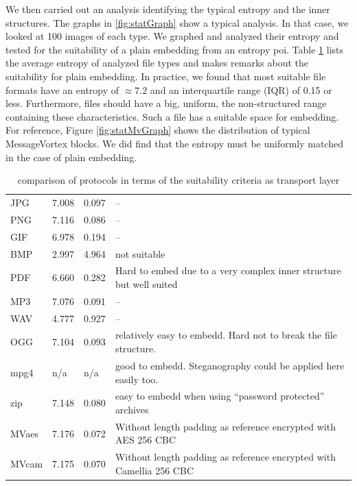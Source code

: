 We then carried out an analysis identifying the typical entropy and the inner structures. The graphs in \ref{fig:statGraph} show a typical analysis. In that case, we looked at 100 images of each type. We graphed and analyzed their entropy and tested for the suitability of a plain embedding from an entropy poi. Table \ref{tab:fileEntropy} lists the average entropy of analyzed file types and makes remarks about the suitability for plain embedding. In practice, we found that most suitable file formats have an entropy of $\approx 7.2$ and an interquartile range (IQR) of 0.15 or less. Furthermore, files should have a big, uniform, the non-structured range containing these characteristics. Such a file has a suitable space for embedding. For reference, Figure \ref{fig:statMvGraph} shows the distribution of typical MessageVortex blocks. We did find that the entropy must be uniformly matched in the case of plain embedding.

\begin{table}[!ht]
	\centering\tiny
	\begin{tabular}{|l|l|l|l|}\hline
		\diaghead{\theadfont Type Criteria}{Type}{Criteria} & \thead{Avg. Entropy}     & \thead{IQR} & \thead{Remarks}\\\hline
		JPG       & 7.008  & 0.097 & -- \\              
		PNG       & 7.116  & 0.086 & -- \\              
		GIF       & 6.978  & 0.194 & -- \\              
		BMP       & 2.997  & 4.964 & not suitable \\              
		PDF       & 6.660  & 0.282 & Hard to embed due to a very complex inner structure but well suited \\\hline              
		MP3       & 7.076  & 0.091 & -- \\              
		WAV       & 4.777  & 0.927 & -- \\              
		OGG       & 7.104  & 0.093 & relatively easy to embedd. Hard not to break the file structure. \\\hline              
		mpg4      & n/a    & n/a   & good to embedd. Steganography could be applied here easily too. \\\hline              
		zip       & 7.148  & 0.080 & easy to embedd when using ``password protected''  archives \\\hline\hline
		MVaes     & 7.176  & 0.072 & Without length padding as reference encrypted with AES 256 CBC\\
		MVcam     & 7.175  & 0.070 & Without length padding as reference encrypted with Camellia 256 CBC\\\hline
	\end{tabular}    
	\caption{comparison of protocols in terms of the suitability criteria as transport layer}
	\label{tab:fileEntropy}
\end{table}

